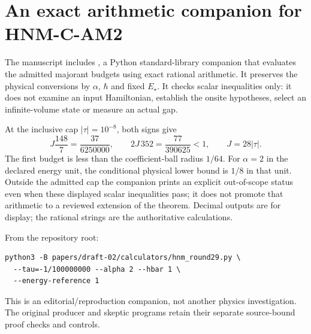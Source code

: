 \section{An exact arithmetic companion for HNM-C-AM2}
\label{sec:r29-calculator}
The manuscript includes , a Python standard-library companion that evaluates the admitted majorant budgets using exact rational arithmetic. It preserves the physical conversions by $\alpha$, $\hbar$ and fixed $E_\star$. It checks scalar inequalities only: it does not examine an input Hamiltonian, establish the onsite hypotheses, select an infinite-volume state or measure an actual gap.

At the inclusive cap $|\tau|=10^{-8}$, both signs give
\begin{equation}
 J\frac{148}{7}=\frac{37}{6250000},\qquad
 2J\,352=\frac{77}{390625}<1,\qquad J=28|\tau|.
 \label{r29:calculator:budget}
\end{equation}
The first budget is less than the coefficient-ball radius $1/64$. For $\alpha=2$ in the declared energy unit, the conditional physical lower bound is $1/8$ in that unit. Outside the admitted cap the companion prints an explicit out-of-scope status even when these displayed scalar inequalities pass; it does not promote that arithmetic to a reviewed extension of the theorem. Decimal outputs are for display; the rational strings are the authoritative calculations.

From the repository root:
\begin{verbatim}
python3 -B papers/draft-02/calculators/hnm_round29.py \
  --tau=-1/100000000 --alpha 2 --hbar 1 \
  --energy-reference 1
\end{verbatim}
This is an editorial/reproduction companion, not another physics investigation. The original producer and skeptic programs retain their separate source-bound proof checks and controls.
